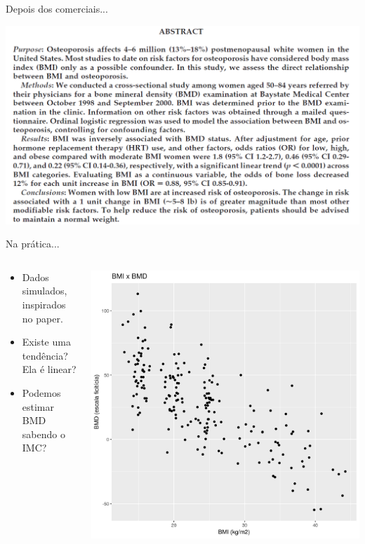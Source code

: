 \documentclass{beamer}
\begin{document}
\begin{frame}{Depois dos comerciais...}
  \begin{center}
    \includegraphics[width=1.175\textwidth]{Cap18-19/bmi-bmd-abstract}
  \end{center}
\end{frame}

\begin{frame}{Na prática...}
  \begin{columns}
    \begin{column}{5cm}
      \begin{itemize}
      \item Dados simulados, inspirados no paper.
      \item Existe uma tendência? Ela é linear?
      \item Podemos estimar BMD sabendo o IMC?
      \end{itemize}
    \end{column}
    \begin{column}{5cm}
      \begin{center}
        \includegraphics[width=\textwidth]{Cap18-19/pratica-plot1}
      \end{center}
    \end{column}
  \end{columns}
\end{frame}
\end{document}
